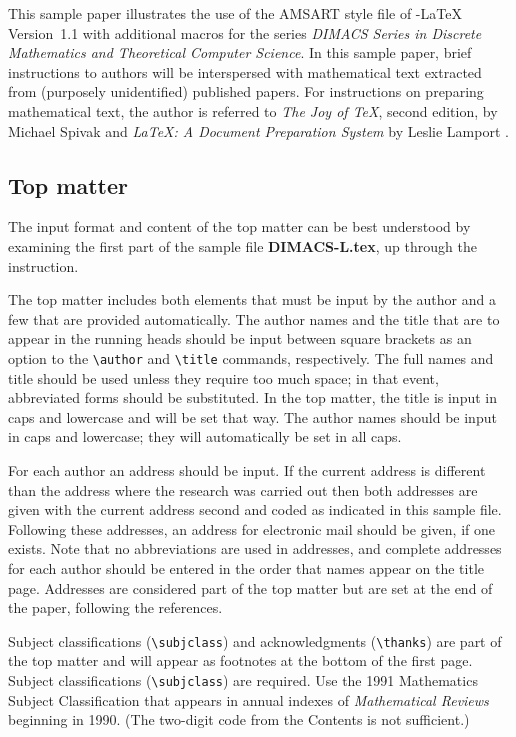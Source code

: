 This sample paper illustrates the use of the AMSART style file of
\AmS-\LaTeX{} Version~1.1 with additional macros for the series {\it
DIMACS Series in Discrete Mathematics and Theoretical Computer Science}.
In this sample paper, brief instructions to authors will be interspersed
with mathematical text extracted from (purposely unidentified) published
papers.  For instructions on preparing mathematical text, the author is
referred to {\it The Joy of \TeX}, second edition, by Michael Spivak
\cite{spivak:jot} and {\it \LaTeX{}: A Document Preparation System} by
Leslie Lamport \cite{lamport:latex}.

\subsection{Top matter}
The input format and content of the top matter can be best understood
by examining the first part of the sample file {\bf DIMACS-L.tex}, up
through the \verb++ instruction.

The top matter includes both elements that must be input by the author and a
few that are provided automatically.  The author names and the title that are
to appear in the running heads should be input between square brackets as an
option to the \verb+\author+ and \verb+\title+ commands, respectively. The full
names and title should be used unless they require too much space; in that
event, abbreviated forms should be substituted. In the top matter, the title is
input in caps and lowercase and will be set that way.  The author names should
be input in caps and lowercase; they will automatically be set in all caps.

For each author an address should be input.  If the current address is
different than the address where the research was carried out then both
addresses are given with the current address second and coded as indicated
in this sample file.   Following these addresses, an
address for electronic mail should be given, if one exists. Note that no
abbreviations are used in addresses, and complete addresses for each author
should be entered in the order that names appear on the title page.  Addresses
are considered part of the top matter but are set at the end of the paper,
following the references.

Subject classifications (\verb+\subjclass+) and acknowledgments
(\verb+\thanks+) are part of the top matter and will appear as footnotes at the
bottom of the first page.  Subject classifications
(\verb+\subjclass+) are required.  Use the 1991 Mathematics Subject Classification
that appears in annual indexes of {\it Mathematical Reviews\/}
beginning in 1990.  (The two-digit code from the Contents is not sufficient.)

